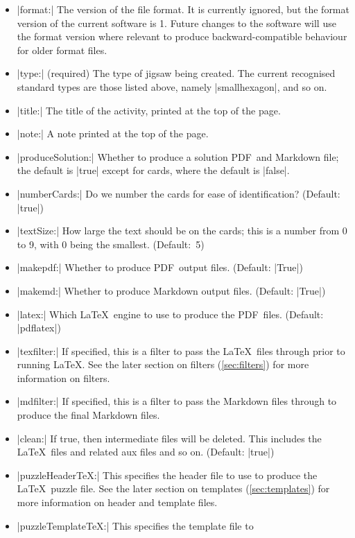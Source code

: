 \documentclass{article}
\def\PDF{{\small PDF}}
\begin{document}
\begin{itemize}
\item |format:| The version of the file format.  It is currently
  ignored, but the format version of the current software is 1.
  Future changes to the software will use the format version where
  relevant to produce backward-compatible behaviour for older format
  files.
\item |type:| (required) The type of jigsaw being created.  The
  current recognised standard types are those listed above, namely
  |smallhexagon|, and so on.
\item |title:| The title of the activity, printed at
  the top of the page.
\item |note:| A note printed at the top of the page.
\item |produceSolution:| Whether to produce a solution \PDF\ and
  Markdown file; the default is |true| except for cards, where
  the default is |false|.
\item |numberCards:| Do we number the cards for ease of
  identification?  (Default: |true|)
\item |textSize:| How large the text should be on the cards; this
  is a number from 0 to 9, with 0 being the smallest.  (Default:~5)
\item |makepdf:| Whether to produce \PDF\ output files.  (Default:
  |True|)
\item |makemd:| Whether to produce Markdown output files.  (Default:
  |True|)
\item |latex:| Which \LaTeX\ engine to use to produce the \PDF\
  files.  (Default: |pdflatex|)
\item |texfilter:| If specified, this is a filter to pass the \LaTeX\
  files through prior to running \LaTeX.  See the later section on
  filters (\ref{sec:filters}) for more information on filters.
\item |mdfilter:| If specified, this is a filter to pass the Markdown
  files through to produce the final Markdown files.
\item |clean:| If true, then intermediate files will be deleted.
  This includes the \LaTeX\ files and related aux files and so on.
  (Default: |true|)
\item |puzzleHeaderTeX:| This specifies the header file to use to
  produce the \LaTeX\ puzzle file.  See the later section on templates
  (\ref{sec:templates}) for more information on header and template
  files.
\item |puzzleTemplateTeX:| This specifies the template file to

\end{itemize}
\end{document}
